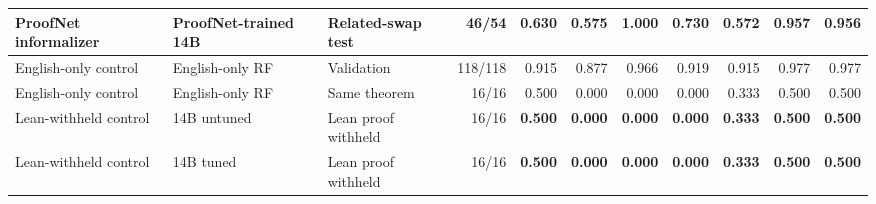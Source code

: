 \begin{table}[htbp]
\begin{adjustbox}{max width=\textwidth}
\begin{tabular}{lllrrrrrrrr}
\midrule
ProofNet informalizer & ProofNet-trained 14B & Related-swap test & 46/54 & 0.630 & 0.575 & 1.000 & 0.730 & 0.572 & 0.957 & 0.956 \\
\midrule
English-only control & English-only RF & Validation & 118/118 & 0.915 & 0.877 & 0.966 & 0.919 & 0.915 & 0.977 & 0.977 \\
English-only control & English-only RF & Same theorem & 16/16 & 0.500 & 0.000 & 0.000 & 0.000 & 0.333 & 0.500 & 0.500 \\
\midrule
Lean-withheld control & 14B untuned & Lean proof withheld & 16/16 & \textbf{0.500} & \textbf{0.000} & \textbf{0.000} & \textbf{0.000} & \textbf{0.333} & \textbf{0.500} & \textbf{0.500} \\
Lean-withheld control & 14B tuned & Lean proof withheld & 16/16 & \textbf{0.500} & \textbf{0.000} & \textbf{0.000} & \textbf{0.000} & \textbf{0.333} & \textbf{0.500} & \textbf{0.500} \\
\bottomrule
\end{tabular}
\end{adjustbox}
\end{table}
